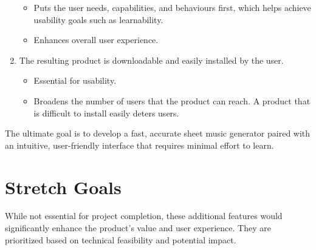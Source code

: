 \documentclass{article}
\begin{document}
\begin{enumerate}
\begin{itemize}
        \item Puts the user needs, capabilities, and behaviours first, which helps achieve 
        usability goals such as learnability.
        \item Enhances overall user experience.
    \end{itemize}
    \item The resulting product is downloadable and easily installed by the user.
    \begin{itemize}
        \item Essential for usability.
        \item Broadens the number of users that the product can reach. A product that is difficult
        to install easily deters users.
    \end{itemize}
\end{enumerate}

The ultimate goal is to develop a fast, accurate sheet music generator paired with an intuitive, user-friendly interface that requires minimal effort to learn.

\section{Stretch Goals}
While not essential for project completion, these additional features would significantly 
enhance the product's value and user experience. They are prioritized based on technical 
feasibility and potential impact.
\end{document}
